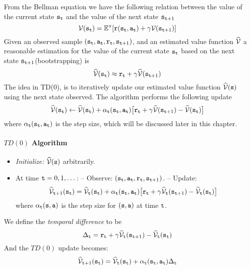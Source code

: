 From the Bellman equation 
we have the following relation between the value of the current state ${\tt s}_{{\tt t}}$
and the value of the next state ${\tt s}_{{\tt t}+1}$
\[\mathcal{V}({\tt s}_{{\tt t}})=
\mathbb{E}^\pi[{\tt r}({\tt s}_{{\tt t}},{\tt a}_{{\tt t}})+\gamma\mathcal{V}({\tt s}_{{\tt t}+1})]\]
Given an observed sample $({\tt s}_{\tt t},{\tt a}_{\tt t},{\tt r}_{\tt t},{\tt s}_{{\tt t}+1})$, 
and an estimated value function $\widehat{\mathcal{V}}$ 
a reasonable estimation for the value of the current state ${\tt s}_{{\tt t}}$ 
based on the next state ${\tt s}_{{\tt t}+1}$(bootstrapping) is
\[
\widehat{\mathcal{V}}({\tt s}_{{\tt t}}) \approx {\tt r}_{{\tt t}}+\gamma\widehat{\mathcal{V}}({\tt s}_{{\tt t}+1})
\]
The idea in TD(0), is to iteratively update our estimated value function $\widehat{\mathcal{V}}({\tt s})$
using the next state observed. The algorithm performs the following update
\[
\widehat{\mathcal{V}}({\tt s}_{\tt t})\leftarrow\widehat{\mathcal{V}}({\tt s}_{\tt t})+\alpha_{\tt t}({\tt s}_{\tt t},{\tt a}_{\tt t})
\big[{\tt r}_{\tt t}+\gamma
\widehat{\mathcal{V}}({\tt s}_{{\tt t}+1})-\widehat{\mathcal{V}}({\tt s}_{\tt t})\big]
\]
where $\alpha_{\tt t}({\tt s}_{\tt t},{\tt a}_{\tt t})$ is the step size,
which will be discussed later in this chapter.

\paragraph{$TD(0)$ Algorithm}
\begin{itemize}
\item \emph{Initialize:} $\widehat{\mathcal{V}}({\tt s})$ arbitrarily.
\item At time ${\tt t}=0,1,\dots$:
-- Observe: $({\tt s}_{\tt t}, {\tt a}_{\tt t}, {\tt r}_{\tt t},
{\tt s}_{{\tt t}+1})$.
-- Update:
\[
\widehat{\mathcal{V}}_{{\tt t}+1}({\tt s}_{\tt t})=\widehat{\mathcal{V}}_{{\tt t}} ({\tt s}_{\tt t})+\alpha_{\tt t}({\tt s}_{\tt t},{\tt a}_{\tt t})
\big[{\tt r}_{\tt t}+\gamma
\widehat{\mathcal{V}}_{{\tt t}}({\tt s}_{{\tt t}+1})-\widehat{\mathcal{V}}_{{\tt t}}({\tt s}_{\tt t})\big]
\]
where $\alpha_{\tt t}({\tt s},{\tt a})$ is the step size for
$({\tt s},{\tt a})$ at time ${\tt t}$.
\end{itemize}
We define the {\em temporal difference} to be
\[
\Delta_{\tt t} ={\tt r}_{\tt t}+\gamma
\widehat{\mathcal{V}}_{{\tt t}}({\tt s}_{{\tt t}+1})-\widehat{\mathcal{V}}_{{\tt t}}({\tt s}_{\tt t})
\]
And the $TD(0)$ update becomes:
\[
\widehat{\mathcal{V}}_{{\tt t}+1}({\tt s}_{\tt t})=\widehat{\mathcal{V}}_{{\tt t}}({\tt s}_{\tt t})+\alpha_{\tt t}({\tt s}_{\tt t},{\tt a}_{\tt t})\Delta_{\tt t}
\]


